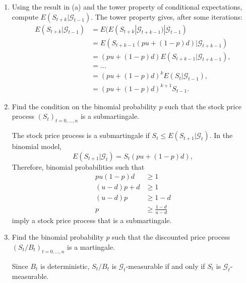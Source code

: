 \documentclass[handout,8pt]{beamer}
\begin{document}
\begin{frame}[allowframebreaks]{ }
\begin{enumerate}
\begin{enumerate}
        \item Using the result in (a) and the tower property of conditional expectations, compute $E(S_{t+k}|\mathcal{G}_{t-1})$.
        The tower property gives, after some iterations:
        \begin{align*}
            E(S_{t+k}|\mathcal{G}_{t-1} ) &= E(E(S_{t+k}|\mathcal{G}_{t+k-1}) | \mathcal{G}_{t-1}) \\
            &= E(S_{t+k-1}(pu+(1-p)d)|\mathcal{G}_{t+k-1}) \\
            &= (pu+(1-p)d)E(S_{t+k-1}|\mathcal{G}_{t+k-1}), \\
            &= ... \\
            &= (pu+(1-p)d)^k E(S_t|\mathcal{G}_{t-1}), \\
            &= (pu+(1-p)d)^{k+1}S_{t-1}.
        \end{align*}
        
        \item Find the condition on the binomial probability $p$ such that the stock price process $(S_t)_{t=0,...,n}$ is a submartingale.\newline
        
        The stock price process is a submartingale if $S_t \leq E(S_{t+1}|\mathcal{G}_t)$. In the binomial model,
        \begin{equation*}
            E(S_{t+1}|\mathcal{G}_t) = S_t(pu+(1-p)d),
        \end{equation*}
        Therefore, binomial probabilities such that
        \begin{align*}
            pu(1-p)d &\geq 1\\
            (u-d)p+d &\geq 1\\
            (u-d)p &\geq 1-d\\
            p &\geq \frac{1-d}{u-d}
        \end{align*}
        imply a stock price process that is a submartingale.
        
        \item Find the binomial probability $p$ such that the discounted price process $(S_t/B_t)_{t=0,...,n}$ is a martingale.\newline
        
        Since $B_t$ is deterministic, $S_t/B_t$ is $\mathcal{G}_t$-measurable if and only if $S_t$ is $\mathcal{G}_t$-measurable. \newline
        

\end{enumerate}
\end{enumerate}
\end{frame}
\end{document}
